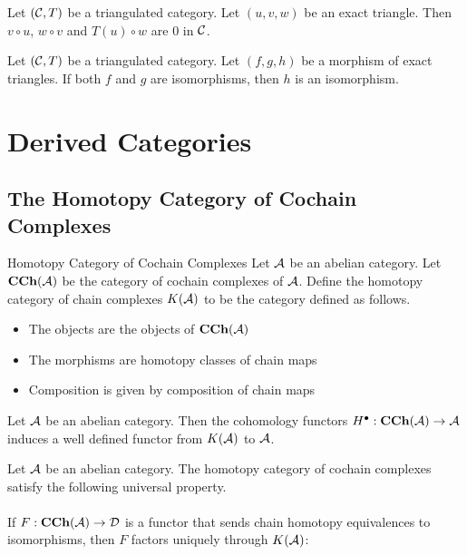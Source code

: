 \documentclass[a4paper]{article}
\begin{document}
\begin{lmm}{}{} Let $(\mathcal{C},T)$ be a triangulated category. Let $(u,v,w)$ be an exact triangle. Then $v\circ u$, $w\circ v$ and $T(u)\circ w$ are $0$ in $\mathcal{C}$. 
\end{lmm}

\begin{lmm}{}{} Let $(\mathcal{C},T)$ be a triangulated category. Let $(f,g,h)$ be a morphism of exact triangles. If both $f$ and $g$ are isomorphisms, then $h$ is an isomorphism. 
\end{lmm}

\pagebreak
\section{Derived Categories}
\subsection{The Homotopy Category of Cochain Complexes}
\begin{defn}{Homotopy Category of Cochain Complexes}{} Let $\mathcal{A}$ be an abelian category. Let $\bold{CCh}(\mathcal{A})$ be the category of cochain complexes of $\mathcal{A}$. Define the homotopy category of chain complexes $K(\mathcal{A})$ to be the category defined as follows. 
\begin{itemize}
\item The objects are the objects of $\bold{CCh}(\mathcal{A})$
\item The morphisms are homotopy classes of chain maps
\item Composition is given by composition of chain maps
\end{itemize}
\end{defn}

\begin{lmm}{}{} Let $\mathcal{A}$ be an abelian category. Then the cohomology functors $H^\bullet:\bold{CCh}(\mathcal{A})\to\mathcal{A}$ induces a well defined functor from $K(\mathcal{A})$ to $\mathcal{A}$. 
\end{lmm}

\begin{prp}{}{} Let $\mathcal{A}$ be an abelian category. The homotopy category of cochain complexes satisfy the following universal property. \\~\\

If $F:\bold{CCh}(\mathcal{A})\to\mathcal{D}$ is a functor that sends chain homotopy equivalences to isomorphisms, then $F$ factors uniquely through $K(\mathcal{A})$: \\~\\
\end{prp}
\end{document}
